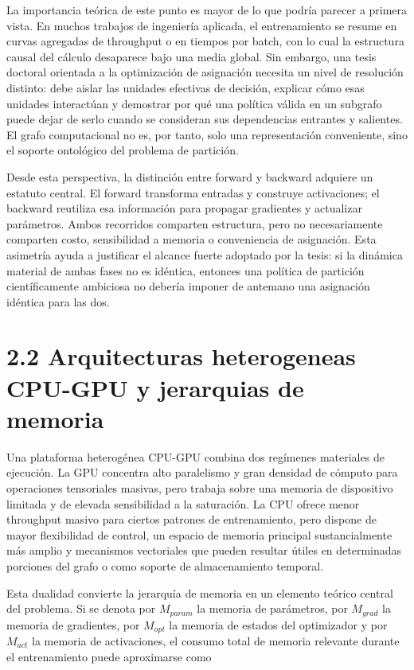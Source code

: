 La importancia teórica de este punto es mayor de lo que podría parecer a primera vista. En muchos trabajos de ingeniería aplicada, el entrenamiento se resume en curvas agregadas de throughput o en tiempos por batch, con lo cual la estructura causal del cálculo desaparece bajo una media global. Sin embargo, una tesis doctoral orientada a la optimización de asignación necesita un nivel de resolución distinto: debe aislar las unidades efectivas de decisión, explicar cómo esas unidades interactúan y demostrar por qué una política válida en un subgrafo puede dejar de serlo cuando se consideran sus dependencias entrantes y salientes. El grafo computacional no es, por tanto, solo una representación conveniente, sino el soporte ontológico del problema de partición.

Desde esta perspectiva, la distinción entre forward y backward adquiere un estatuto central. El forward transforma entradas y construye activaciones; el backward reutiliza esa información para propagar gradientes y actualizar parámetros. Ambos recorridos comparten estructura, pero no necesariamente comparten costo, sensibilidad a memoria o conveniencia de asignación. Esta asimetría ayuda a justificar el alcance fuerte adoptado por la tesis: si la dinámica material de ambas fases no es idéntica, entonces una política de partición científicamente ambiciosa no debería imponer de antemano una asignación idéntica para las dos.

\section{2.2 Arquitecturas heterogeneas CPU-GPU y jerarquias de memoria}
Una plataforma heterogénea CPU-GPU combina dos regímenes materiales de ejecución. La GPU concentra alto paralelismo y gran densidad de cómputo para operaciones tensoriales masivas, pero trabaja sobre una memoria de dispositivo limitada y de elevada sensibilidad a la saturación. La CPU ofrece menor throughput masivo para ciertos patrones de entrenamiento, pero dispone de mayor flexibilidad de control, un espacio de memoria principal sustancialmente más amplio y mecanismos vectoriales que pueden resultar útiles en determinadas porciones del grafo o como soporte de almacenamiento temporal.

Esta dualidad convierte la jerarquía de memoria en un elemento teórico central del problema. Si se denota por $M_{param}$ la memoria de parámetros, por $M_{grad}$ la memoria de gradientes, por $M_{opt}$ la memoria de estados del optimizador y por $M_{act}$ la memoria de activaciones, el consumo total de memoria relevante durante el entrenamiento puede aproximarse como

